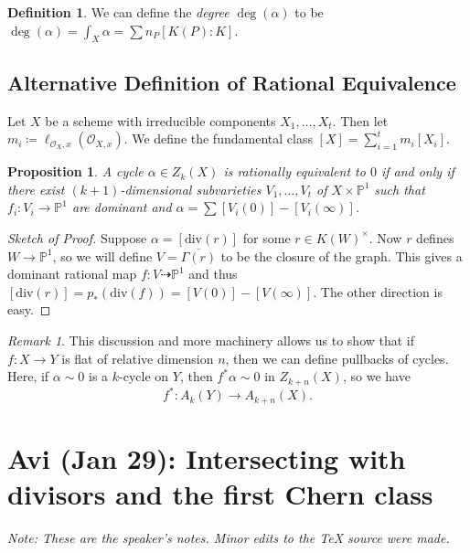 \documentclass[leqno, openany]{memoir}
\newtheorem{prop}[thm]{Proposition}
\theoremstyle{definition}
\newtheorem{defn}[thm]{Definition}
\theoremstyle{remark}
\newtheorem{rmk}[thm]{Remark}
\theoremstyle{plain}
\theoremstyle{definition}
\theoremstyle{remark}
\renewcommand{\P}{\mathbb{P}}
\newcommand{\msc}[1]{\mathscr{#1}}
\newcommand{\mr}[1]{\mathrm{#1}}
\newcommand{\ol}[1]{\overline{#1}}
\begin{document}
\begin{defn}
    We can define the \textit{degree} $\deg(\alpha)$ to be $\deg (\alpha) = \int_X \alpha = \sum n_P [K(P) : K]$.
\end{defn}

\section{Alternative Definition of Rational Equivalence}%
\label{sec:alternative_definition_of_rational_equivalence}

Let $X$ be a scheme with irreducible components $X_1, \ldots, X_t$. Then let $m_i \coloneqq \ell_{\msc{O}_X,x} (\msc{O}_{X,x})$. We define the fundamental class $[X] = \sum_{i=1}^t m_i [X_i]$.

\begin{prop}
    A cycle $\alpha \in Z_k(X)$ is rationally equivalent to $0$ if and only if there exist $(k+1)$-dimensional subvarieties $V_1, \ldots, V_t$ of $X \times \P^1$ such that $f_i \colon V_i \to \P^1$ are dominant and $\alpha = \sum [V_i(0)] - [V_i(\infty)]$.
\end{prop}

\begin{proof}[Sketch of Proof]
    Suppose $\alpha = [\mr{div}(r)]$ for some $r \in {K(W)}^{\times}$. Now $r$ defines $W \to \P^1$, so we will define $V = \ol{\Gamma(r)}$ to be the closure of the graph. This gives a dominant rational map $f \colon V \dashrightarrow \P^1$ and thus $[\mr{div}(r)] = p_*(\mr{div}(f)) = [V(0)] - [V(\infty)]$. The other direction is easy.
\end{proof}

\begin{rmk}
    This discussion and more machinery allows us to show that if $f \colon X \to Y$ is flat of relative dimension $n$, then we can define pullbacks of cycles. Here, if $\alpha \sim 0$ is a $k$-cycle on $Y$, then $f^* \alpha \sim 0$ in $Z_{k+n}(X)$, so we have
    \[ f^* \colon A_k (Y) \to A_{k+n}(X). \]
\end{rmk}

\chapter{Avi (Jan 29): Intersecting with divisors and the first Chern class}%
\label{cha:avi_jan_29_intersecting_with_divisors_and_the_first_chern_class}

\textit{Note: These are the speaker's notes. Minor edits to the {\TeX} source were made.} 
\end{document}
